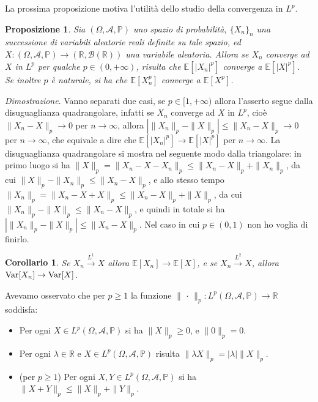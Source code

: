 \documentclass[11pt]{book}
\makeatletter
\theoremstyle{Definizione}
\theoremstyle{TeoremaProposizioneLemmaCorollario}
\newtheorem{mycor}[myteo]{Corollario}
\newtheorem{mypropo}[myteo]{Proposizione}
\theoremstyle{OsservazioneNota}
\renewenvironment{proof}[1][\proofname]{\par
  \normalfont \topsep6\p@\@plus6\p@\relax
  \trivlist
  \item[\hskip\labelsep
        \itshape
    #1\@addpunct{.}]\ignorespaces
}{%
  \endtrivlist\@endpefalse
}
\newcommand{\R}{\mathbb{R}}
\renewcommand{\P}{\mathbb{P}}
\newcommand{\E}{\mathbb{E}}
\newcommand{\Var}{\textup{Var}}
\newcommand{\toL}[1]{\overset{L^{#1}}{\to}}
\renewenvironment{proof}{\textsl{Dimostrazione}.}{}
\makeatother
\begin{document}
\noindent
La prossima proposizione motiva l'utilità dello studio della convergenza in $L^p$.
\begin{boxpro}
\begin{mypropo}
Sia $(\Omega,\mathcal{A},\P)$ uno spazio di probabilità, $\{X_n\}_n$ una successione di variabili aleatorie reali definite su tale spazio, ed $X:(\Omega,\mathcal{A},\P)\longrightarrow (\R,\mathcal{B}(\R))$ una variabile aleatoria. Allora se $X_n$ converge ad $X$ in $L^p$ per qualche $p\in (0,+\infty)$, risulta che $\E[|X_n|^p]$ converge a $\E[|X|^p]$.\\
Se inoltre $p$ è naturale, si ha che $\E[X_n^p]$ converge a $\E[X^p]$.
\end{mypropo}
\tcblower
\begin{proof}
Vanno separati due casi, se $p\in [1,+\infty)$ allora l'asserto segue dalla disuguaglianza quadrangolare, infatti se $X_n$ converge ad $X$ in $L^p$, cioè $\| X_n-X\|_p \to 0$ per $n\to\infty$, allora $|\|X_n\|_p - \|X\|_p| \leq \|X_n-X\|_p \to 0$ per $n\to \infty$, che equivale a dire che $\E[|X_n|^p] \to \E[|X|^p]$ per $n\to\infty$. La disuguaglianza quadrangolare si mostra nel seguente modo dalla triangolare: in primo luogo si ha $\|X\|_p = \|X_n-X-X_n\|_p \leq \|X_n-X\|_p + \|X_n\|_p$, da cui $\|X\|_p-\|X_n\|_p \leq \|X_n-X\|_p$, e allo stesso tempo $\|X_n\|_p = \|X_n-X+X\|_p \leq \|X_n-X\|_p+\|X\|_p$, da cui $\|X_n\|_p-\|X\|_p \leq \|X_n-X\|_p$, e quindi in totale si ha $|\|X_n\|_p - \|X\|_p| \leq \|X_n-X\|_p$. Nel caso in cui $p\in (0,1)$ non ho voglia di finirlo.
\end{proof}
\end{boxpro}
\begin{boxoss}
\begin{mycor}
Se $X_n \toL{1} X$ allora $\E[X_n] \to \E[X]$, e se $X_n \toL{2} X$, allora $\Var[X_n] \to \Var[X]$.
\end{mycor}
\end{boxoss}
\noindent
Avevamo osservato che per $p \geq 1$ la funzione $\|\,\cdot\,\|_p:L^p(\Omega,\mathcal{A},\P) \longrightarrow \R$ soddisfa:
\begin{itemize}
\item Per ogni $X\in L^p(\Omega,\mathcal{A},\P)$ si ha $\|X\|_p \geq 0$, e $\|0\|_p = 0$.
\item Per ogni $\lambda \in \R$ e $X\in L^p(\Omega,\mathcal{A},\P)$ risulta $\|\lambda X\|_p = |\lambda |\| X \|_p$.
\item (per $p\geq 1$) Per ogni $X,Y\in L^p(\Omega,\mathcal{A},\P)$ si ha $\|X+Y\|_p \leq \|X\|_p+\|Y\|_p$.
\end{itemize}
\end{document}
